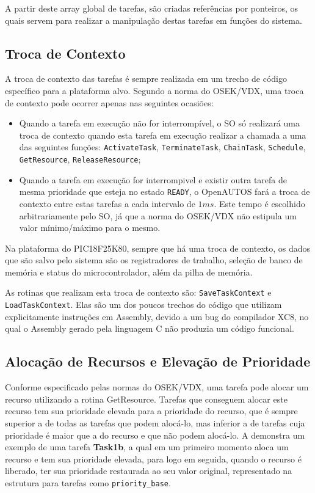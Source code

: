 A partir deste array global de tarefas, são criadas referências por ponteiros, os quais servem para realizar a manipulação destas tarefas em funções do sistema.

\subsection{Troca de Contexto}

A troca de contexto das tarefas é sempre realizada em um trecho de código específico para a plataforma alvo. Segundo a norma do OSEK/VDX, uma troca de contexto pode ocorrer apenas nas seguintes ocasiões:

\begin{itemize}
	\item Quando a tarefa em execução não for interrompível, o SO só realizará uma troca de contexto quando esta tarefa em execução realizar a chamada a uma das seguintes funções: \texttt{ActivateTask}, \texttt{TerminateTask}, \texttt{ChainTask}, \texttt{Schedule}, \texttt{GetResource}, \texttt{\justify ReleaseResource};
	\item Quando a tarefa em execução for interrompivel e existir outra tarefa de mesma prioridade que esteja no estado \texttt{READY}, o OpenAUTOS fará a troca de contexto entre estas tarefas a cada intervalo de $1ms$. Este tempo é escolhido arbitrariamente pelo SO, já que a norma do OSEK/VDX não estipula um valor mínimo/máximo para o mesmo.
\end{itemize}

Na plataforma do PIC18F25K80, sempre que há uma troca de contexto, os dados que são salvo pelo sistema são os registradores de trabalho, seleção de banco de memória e status do microcontrolador, além da pilha de memória.

As rotinas que realizam esta troca de contexto são: \texttt{SaveTaskContext} e \texttt{LoadTaskContext}. Elas são um dos poucos trechos do código que utilizam explicitamente instruções em Assembly, devido a um bug do compilador XC8, no qual o Assembly gerado pela linguagem C não produzia um código funcional.

\subsection{Alocação de Recursos e Elevação de Prioridade}

Conforme especificado pelas normas do OSEK/VDX, uma tarefa pode alocar um recurso utilizando a rotina GetResource. Tarefas que conseguem alocar este recurso tem sua prioridade elevada para a prioridade do recurso, que é sempre superior a de todas as tarefas que podem alocá-lo, mas inferior a de tarefas cuja prioridade é maior que a do recurso e que não podem alocá-lo. A  demonstra um exemplo de uma tarefa \textbf{Task1b}, a qual em um primeiro momento aloca um recurso e tem sua prioridade elevada, para logo em seguida, quando o recurso é liberado, ter sua prioridade restaurada ao seu valor original, representado na estrutura para tarefas como \texttt{priority\_base}.


